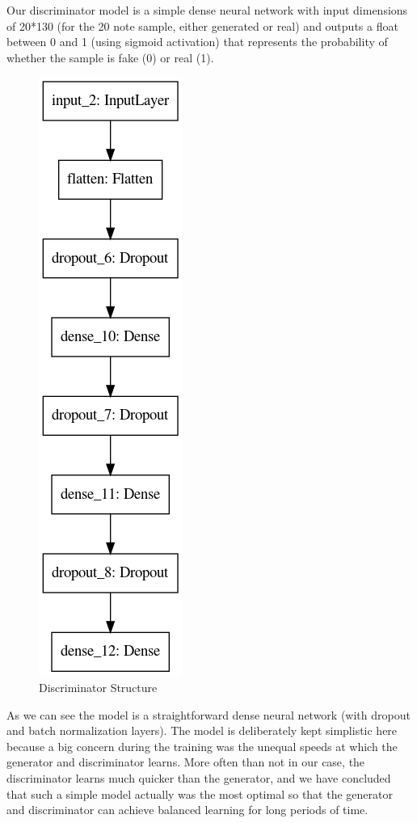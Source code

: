 \documentclass[12pt,oneside]{chicagocapstone}
\begin{document}
Our discriminator model is a simple dense neural network with input dimensions of 20*130 (for the 20 note sample, either generated or real) and outputs a float between 0 and 1 (using sigmoid activation) that represents the probability of whether the sample is fake (0) or real (1).
\begin{figure}

{\centering \includegraphics[width=0.3\linewidth]{figure/dis_model} 

}

\caption{Discriminator Structure}\label{fig:unnamed-chunk-6}
\end{figure}
As we can see the model is a straightforward dense neural network (with dropout and batch normalization layers). The model is deliberately kept simplistic here because a big concern during the training was the unequal speeds at which the generator and discriminator learns. More often than not in our case, the discriminator learns much quicker than the generator, and we have concluded that such a simple model actually was the most optimal so that the generator and discriminator can achieve balanced learning for long periods of time.
\end{document}

